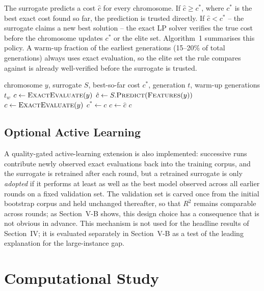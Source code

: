 \documentclass[conference]{IEEEtran}
\begin{document}
The surrogate predicts a cost $\hat{c}$ for every chromosome. If
$\hat{c} \ge c^{\ast}$, where $c^{\ast}$ is the best exact cost found so far,
the prediction is trusted directly. If $\hat{c} < c^{\ast}$ -- the surrogate
claims a new best solution -- the exact LP solver verifies the true cost
before the chromosome updates $c^{\ast}$ or the elite set. Algorithm~1
summarises this policy. A warm-up fraction of the earliest generations
(15--20\% of total generations) always uses exact evaluation, so the elite
set the rule compares against is already well-verified before the surrogate
is trusted.

\begin{algorithm}[t]
\caption{Confidence-aware fitness evaluation for chromosome $y$}
\begin{algorithmic}[1]
\Require chromosome $y$, surrogate $S$, best-so-far cost $c^{\ast}$, generation $t$, warm-up generations $t_w$
    \State $c \gets \textsc{ExactEvaluate}(y)$
\Else
    \State $\hat{c} \gets S.\textsc{Predict}(\textsc{Features}(y))$
        \State $c \gets \textsc{ExactEvaluate}(y)$
         \State $c^{\ast} \gets c$ \EndIf
    \Else
        \State $c \gets \hat{c}$
    \EndIf
\EndIf
\State \Return $c$
\end{algorithmic}
\end{algorithm}

\subsection{Optional Active Learning}

A quality-gated active-learning extension is also implemented: successive
runs contribute newly observed exact evaluations back into the training
corpus, and the surrogate is retrained after each round, but a retrained
surrogate is only \emph{adopted} if it performs at least as well as the best
model observed across all earlier rounds on a fixed validation set. The
validation set is carved once from the initial bootstrap corpus and held
unchanged thereafter, so that $R^2$ remains comparable across rounds; as
Section~V-B shows, this design choice has a consequence that is not obvious in
advance. This mechanism is not used for the headline results of
Section~IV; it is evaluated separately in Section~V-B as a test of the leading
explanation for the large-instance gap.

\section{Computational Study}
\end{document}
